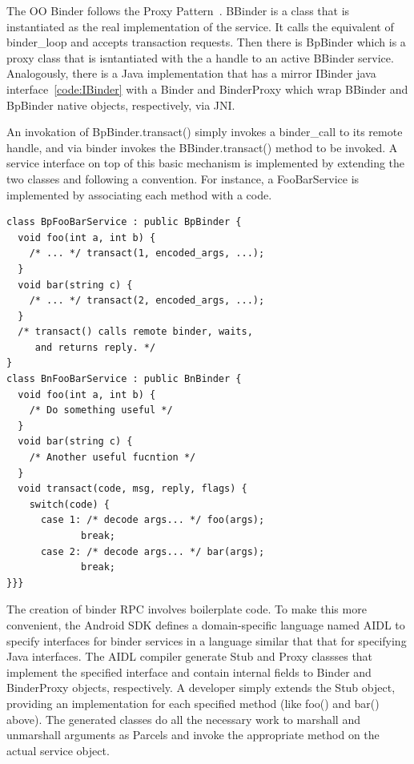 \documentclass[prodmode]{acmlarge}
\begin{document}
The OO Binder follows the Proxy Pattern~\cite{ProxyPattern}. BBinder is a class that is instantiated as the real implementation of the service. It calls the equivalent of binder\_loop and accepts transaction requests. Then there is BpBinder which is a proxy class that is isntantiated with the a handle to an active BBinder service. Analogously, there is a Java implementation that has a mirror IBinder java interface~\ref{code:IBinder} with a Binder and BinderProxy which wrap BBinder and BpBinder native objects, respectively, via JNI.

An invokation of BpBinder.transact() simply invokes a binder\_call to its remote handle, and via binder invokes the BBinder.transact() method to be invoked. A service interface on top of this basic mechanism is implemented by extending the two classes and following a convention. For instance, a FooBarService is implemented by associating each method with a code.

\begin{Verbatim}[samepage=true]
class BpFooBarService : public BpBinder {
  void foo(int a, int b) {
    /* ... */ transact(1, encoded_args, ...);
  }
  void bar(string c) {
    /* ... */ transact(2, encoded_args, ...);
  }
  /* transact() calls remote binder, waits,
     and returns reply. */
}
class BnFooBarService : public BnBinder {
  void foo(int a, int b) {
    /* Do something useful */
  }
  void bar(string c) {
    /* Another useful fucntion */
  }
  void transact(code, msg, reply, flags) {
    switch(code) {
      case 1: /* decode args... */ foo(args);
             break;
      case 2: /* decode args... */ bar(args);
             break;
}}}
\end{Verbatim}



The creation of binder RPC involves boilerplate code. To make this more convenient, the Android SDK defines a domain-specific language named AIDL to specify interfaces for binder services in a language similar that that for specifying Java interfaces. The AIDL compiler generate Stub and Proxy classses that implement the specified interface and contain internal fields to Binder and BinderProxy objects, respectively. A developer simply extends the Stub object, providing an implementation for each specified method (like foo() and bar() above). The generated classes do all the necessary work to marshall and unmarshall arguments as Parcels and invoke the appropriate method on the actual service object.
\end{document}
